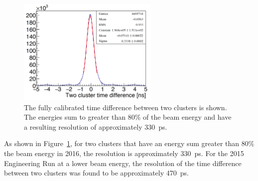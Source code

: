 \begin{figure}[htb]
  \centering
      \includegraphics[width=0.6\textwidth]{pics/performance/2clusterTres.png}
  \caption[Time resolution for the time difference between two clusters]{The fully calibrated time difference between two clusters is shown. The energies sum to greater than 80$\%$ of the beam energy and have a resulting resolution of approximately 330~ps.}
  \label{Figure:timeRes2cl}
\end{figure}

As shown in Figure~\ref{Figure:timeRes2cl}, for two clusters that have an energy sum greater than 80$\%$ the beam energy in 2016, the resolution is approximately 330~ps. For the 2015 Engineering Run at a lower beam energy, the resolution of the time difference between two clusters was found to be approximately 470~ps. 

%
%
%

